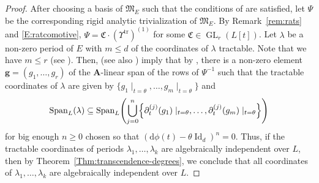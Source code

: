 \documentclass[10pt,a4paper]{amsart}
\theoremstyle{plain} %
\theoremstyle{definition}
\theoremstyle{remark}
\newcommand{\bA}{\mathbf{A}}
\newcommand{\rd}{\mathrm{d}}
\newcommand{\tr}{\operatorname{tr}}
\newcommand{\Id}{\operatorname{Id}}
\newcommand{\Span}{\operatorname{Span}}
\newcommand{\GL}{\operatorname{GL}}
\newcommand{\dmot}{\mathfrak{M}} %
\newcommand{\hde}[1]{\partial^{(#1)}}  %
\numberwithin{equation}{subsection}
\begin{document}
\begin{proof}
    After choosing a basis of $\dmot_E$ such that the conditions of \cite[Prop.~3.28]{cn-mp:hpqpam} are satisfied, let $\Psi$ be the corresponding rigid analytic trivialization of $\dmot_E$. By Remark~\ref{rem:rats} and \eqref{E:ratcomotive}, $\Psi = \mathfrak{C}\cdot(\Upsilon^{\tr})^{(1)}$ for some $\mathfrak{C}\in \GL_r(L[t])$.  
    Let $\lambda$ be a non-zero period of $E$ with $m \leq d$ of the coordinates of $\lambda$ tractable. Note that we have $m \leq r$ (see \cite[Rem.~3.30]{cn-mp:hpqpam}).  Then, \cite[Thm.~2.5.32]{uh-akj:pthshcff} (see also \cite[Prop.~3.18(b)]{cn-mp:hpqpam}) imply that by \cite[Prop.~3.28]{cn-mp:hpqpam}, there is a non-zero element $\boldsymbol{g}=(g_1, \dots, g_r)$ of the $\bA$-linear span of the rows of $\Psi^{-1}$ such that the tractable coordinates of $\lambda$ are given by $\{g_1\!\mid_{t=\theta}, \dots, g_m\!\mid_{t=\theta}\}$ and 
    \[
 \Span_{L}(\lambda) \subseteq \Span_L \Biggl( \bigcup_{j=0}^n  \Bigl\{ \hde{j}_t(g_1)\mid_{t=\theta}, \dots, \hde{j}_t(g_m)\mid_{t=\theta}  \Bigr\} \Biggr)
    \]
    for big enough $n\geq 0$ chosen so that $(\rd\phi(t)-\theta \Id_d)^n=0$. Thus, if the tractable coordinates of periods $\lambda_1, \dots, \lambda_k$ are algebraically independent over $L$, then by Theorem~\ref{Thm:transcendence-degrees}, we conclude that all coordinates of $\lambda_1, \dots, \lambda_k$ are algebraically independent over $L$.  
\end{proof}
\end{document}
